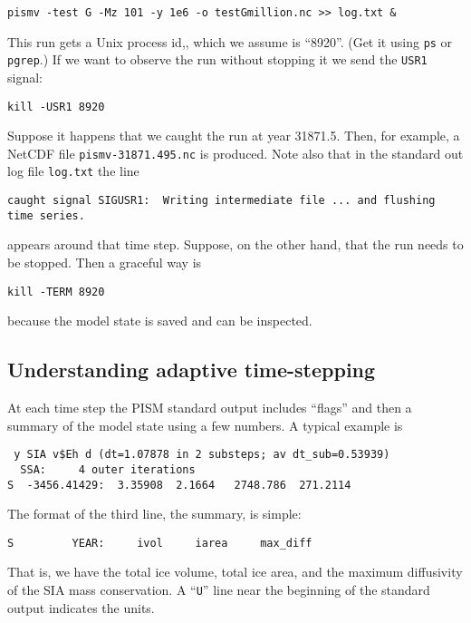 \begin{verbatim}
pismv -test G -Mz 101 -y 1e6 -o testGmillion.nc >> log.txt &
\end{verbatim}

\noindent This run gets a Unix process id,, which we assume is ``8920''.  (Get it using \texttt{ps} or \texttt{pgrep}.)  If we want to observe the run without stopping it we send the \texttt{USR1} signal:

\begin{verbatim}
kill -USR1 8920
\end{verbatim}

\noindent Suppose it happens that we caught the run at year 31871.5.  Then, for example, a NetCDF file \texttt{pismv-31871.495.nc} is produced.  Note also that in the standard out log file \texttt{log.txt} the line

\begin{verbatim}
caught signal SIGUSR1:  Writing intermediate file ... and flushing time series.
\end{verbatim}
\noindent appears around that time step.  Suppose, on the other hand, that the run needs to be stopped.  Then a graceful way is

\begin{verbatim}
kill -TERM 8920
\end{verbatim}

\noindent because the model state is saved and can be inspected.



\subsection{Understanding adaptive time-stepping} \label{subsect:adapt}

At each time step the PISM standard output includes ``flags'' and then a summary of the model state using a few numbers.  A typical example is
\small
\begin{verbatim}
 y SIA v$Eh d (dt=1.07878 in 2 substeps; av dt_sub=0.53939)
  SSA:     4 outer iterations
S  -3456.41429:  3.35908  2.1664   2748.786  271.2114
\end{verbatim}
\normalsize
\noindent The format of the third line, the summary, is simple:
\small
\begin{verbatim}
S         YEAR:     ivol     iarea     max_diff
\end{verbatim}
\normalsize
That is, we have the total ice volume, total ice area, and the maximum diffusivity of the SIA mass conservation.  A ``\texttt{U}'' line near the beginning of the standard output indicates the units.

